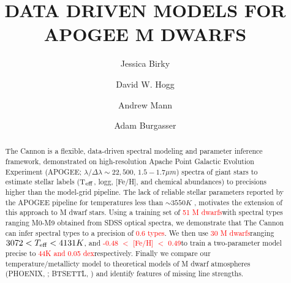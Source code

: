 \documentclass[modern]{aastex62}
\begin{document}
\title{DATA DRIVEN MODELS FOR APOGEE M DWARFS}


\author[0000-0002-7961-6881]{Jessica Birky}

\author[0000-0003-2866-9403]{David W. Hogg}

\author[0000-0003-3654-1602]{Andrew Mann}

\author[0000-0002-6523-9536]{Adam Burgasser}

\begin{abstract}

The Cannon \citep{Ness:2015} is a flexible, data-driven spectral modeling and parameter inference framework, demonstrated on high-resolution Apache Point Galactic Evolution Experiment (APOGEE; $\lambda/\Delta\lambda\sim22,500$, $1.5-1.7 \mu m$) spectra of giant stars to estimate stellar labels (T$_{\rm eff}$, logg, [Fe/H], and chemical abundances) to precisions higher than the model-grid pipeline. The lack of reliable stellar parameters reported by the APOGEE pipeline for temperatures less than $\sim3550K$ \citep{Schmidt:2016}, motivates the extension of this approach to M dwarf stars. Using a training set of \textcolor{red}{51 M dwarfs}\textcolor{black} with spectral types ranging M0-M9 obtained from SDSS optical spectra, we demonstrate that The Cannon can infer spectral types to a precision of \textcolor{red}{0.6 types}\textcolor{black}. We then use \textcolor{red}{30 M dwarfs}\textcolor{black} ranging \textcolor{red}{$3072 < T_{\rm eff} < 4131K$}\textcolor{black}, and \textcolor{red}{-0.48 $<$ [Fe/H] $<$ 0.49}\textcolor{black} to train a two-parameter model precise to \textcolor{red}{44K and 0.05 dex}\textcolor{black} respectively. Finally we compare our temperature/metallicty model to theoretical models of M dwarf atmospheres (PHOENIX, \citealt{Husser:2013}; BTSETTL, \citealt{Allard:2011}) and identify features of missing line strengths.

\end{abstract}
\end{document}

